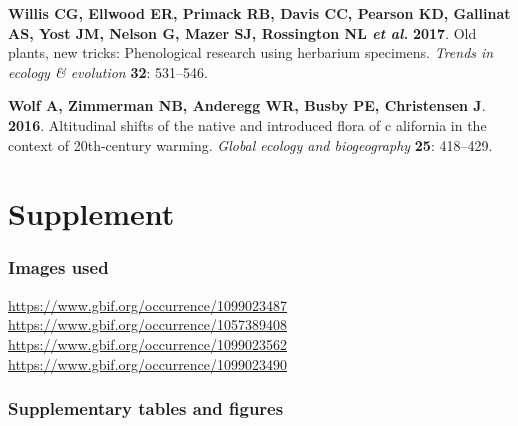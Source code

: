 \documentclass[man,floatsintext]{apa6}
\theoremstyle{definition}
\theoremstyle{definition}
\theoremstyle{definition}
\theoremstyle{remark}
\begin{document}
\leavevmode\hypertarget{ref-willis2017old}{}%
\textbf{\textnormal{Willis CG}, \textnormal{Ellwood ER},
\textnormal{Primack RB}, \textnormal{Davis CC}, \textnormal{Pearson KD},
\textnormal{Gallinat AS}, \textnormal{Yost JM}, \textnormal{Nelson G},
\textnormal{Mazer SJ}, \textnormal{Rossington NL} \emph{et al.}}
\textbf{2017}. Old plants, new tricks: Phenological research using
herbarium specimens. \emph{Trends in ecology \& evolution} \textbf{32}:
531--546.

\leavevmode\hypertarget{ref-wolf2016altitudinal}{}%
\textbf{\textnormal{Wolf A}, \textnormal{Zimmerman NB},
\textnormal{Anderegg WR}, \textnormal{Busby PE}, \textnormal{Christensen
J}}. \textbf{2016}. Altitudinal shifts of the native and introduced
flora of c alifornia in the context of 20th-century warming.
\emph{Global ecology and biogeography} \textbf{25}: 418--429.

\endgroup

\newpage
\setcounter{table}{0}  \renewcommand{\thetable}{S\arabic{table}} \setcounter{figure}{0} \renewcommand{\thefigure}{S\arabic{figure}}

\hypertarget{supplement}{%
\section{Supplement}\label{supplement}}

\hypertarget{images-used}{%
\subsubsection{Images used}\label{images-used}}

\url{https://www.gbif.org/occurrence/1099023487}\\
\url{https://www.gbif.org/occurrence/1057389408}~\\
\url{https://www.gbif.org/occurrence/1099023562}~\\
\url{https://www.gbif.org/occurrence/1099023490}

\hypertarget{supplementary-tables-and-figures}{%
\subsubsection{Supplementary tables and
figures}\label{supplementary-tables-and-figures}}

\newpage
\end{document}
